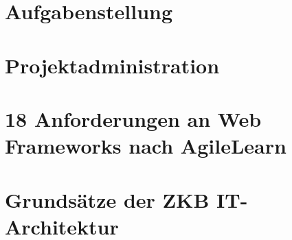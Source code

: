 \documentclass[
11pt, %
a4paper, %
BCOR15mm, %
DIV14, %
footsepline = false, %
headsepline, %
oneside,
openright,
halfparskip, %
abstracton, %
listof=totocnumbered, %
bibliography=totocnumbered %
]{scrreprt}
\begin{document}
  \cleardoublepage
  
  
  \chapter{Aufgabenstellung}\label{chapter:Aufgabenstellung}
  
  

  \cleardoublepage
   
    
  \chapter{Projektadministration}\label{chapter:Projektadministration}
 
  

  \cleardoublepage
   
    
  \chapter{18 Anforderungen an Web Frameworks nach
  AgileLearn}\label{chapter:18AnforderungenNachAgileLearn}
 
  

  \cleardoublepage
   
    
  \chapter{Grundsätze der ZKB
  IT-Architektur}\label{chapter:GrundsaetzeDerZkbItArchitektur}
 
\end{document}
